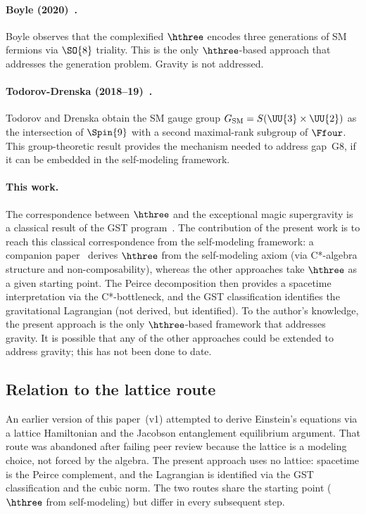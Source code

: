\paragraph{Boyle (2020)~\cite{Boyle2020}.}
Boyle observes that the complexified $\hthree$ encodes three generations
of SM fermions via $\SO{8}$ triality. This is the only $\hthree$-based
approach that addresses the generation problem. Gravity is not addressed.

\paragraph{Todorov-Drenska (2018--19)~\cite{TodorovDrenska2018,
TodorovDrenska2019}.}
Todorov and Drenska obtain the SM gauge group
$G_{\mathrm{SM}} = S(\UU{3} \times \UU{2})$ as the intersection of
$\Spin{9}$ with a second maximal-rank subgroup of $\Ffour$. This
group-theoretic result provides the mechanism needed to address
gap~G8, if it can be embedded in the self-modeling framework.

\paragraph{This work.}
The correspondence between $\hthree$ and the exceptional magic
supergravity is a classical result of the GST
program~\cite{GST1983,GST1984}. The contribution of the present
work is to reach this classical correspondence from the self-modeling
framework: a companion paper~\cite{Paper7} derives $\hthree$ from
the self-modeling axiom (via C*-algebra structure and
non-composability), whereas the other approaches take $\hthree$ as
a given starting point. The Peirce decomposition then provides a
spacetime interpretation via the C*-bottleneck, and the GST
classification identifies the gravitational Lagrangian (not derived,
but identified). To the author's knowledge, the present approach is
the only $\hthree$-based framework that addresses gravity. It is
possible that any of the other approaches could be extended to address
gravity; this has not been done to date.

\subsection{Relation to the lattice route}

An earlier version of this paper~(v1) attempted to derive Einstein's
equations via a lattice Hamiltonian and the Jacobson entanglement
equilibrium argument. That route was abandoned after failing peer review
because the lattice is a modeling choice, not forced by the algebra.
The present approach uses no lattice: spacetime is the Peirce complement,
and the Lagrangian is identified via the GST classification and the
cubic norm. The two routes share the starting point ($\hthree$ from
self-modeling) but differ in every subsequent step.

